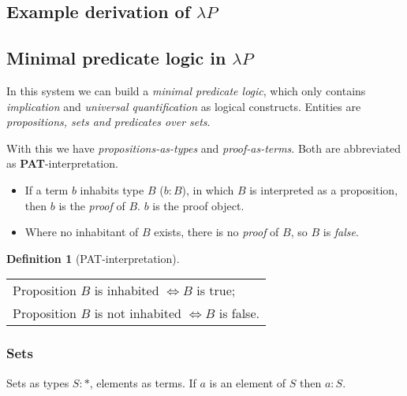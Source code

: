 \documentclass[12pt, a4paper]{article}
\newtheorem{definition}{Definition}[section]
\begin{document}
\subsection{Example derivation of \texorpdfstring{$\lambda P$}{}}

\begin{flagderiv}
\end{flagderiv}

\subsection{Minimal predicate logic in \texorpdfstring{$\lambda P$}{}}
In this system we can build a \textit{minimal predicate logic}, which only contains \textit{implication} and \textit{universal quantification}
as logical constructs. Entities are \textit{propositions, sets and predicates over sets}.

With this we have \textit{propositions-as-types} and \textit{proof-as-terms}. Both are abbreviated as \textbf{PAT}-interpretation.

\begin{itemize}
    \item If a term $b$ inhabits type $B$ ($b : B$), in which $B$ is interpreted as a proposition, then $b$ is the \textit{proof} of $B$. $b$ is the proof object.
    \item Where no inhabitant of $B$ exists, there is no \textit{proof} of $B$, so $B$ is \textit{false}.
\end{itemize}

\begin{definition}[PAT-interpretation]
\end{definition}
\begin{center}
    \begin{tabular}{| l |} 
    \hline
    Proposition $B$ is inhabited $\iff B$ is true;\\
    Proposition $B$ is not inhabited $\iff B$ is false.
    \\
    \hline
   \end{tabular}
\end{center}

\subsubsection{Sets}
Sets as types $S : *$, elements as terms. If $a$ is an element of $S$ then $a : S$.
\end{document}
